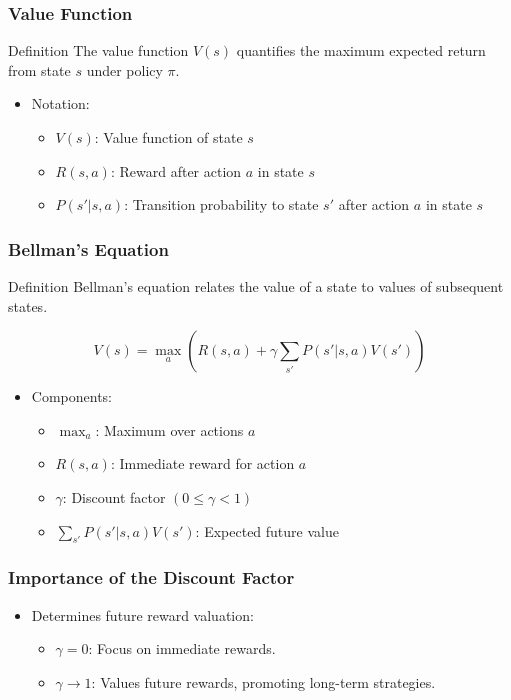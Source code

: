 \documentclass[aspectratio=169]{beamer}
\begin{document}
\begin{frame}[fragile]
    \frametitle{Value Function}
    \begin{block}{Definition}
        The value function \( V(s) \) quantifies the maximum expected return from state \( s \) under policy \( \pi \).
    \end{block}
    \begin{itemize}
        \item Notation:
        \begin{itemize}
            \item \( V(s) \): Value function of state \( s \)
            \item \( R(s, a) \): Reward after action \( a \) in state \( s \)
            \item \( P(s' | s, a) \): Transition probability to state \( s' \) after action \( a \) in state \( s \)
        \end{itemize}
    \end{itemize}
\end{frame}

\begin{frame}[fragile]
    \frametitle{Bellman's Equation}
    \begin{block}{Definition}
        Bellman's equation relates the value of a state to values of subsequent states.
    \end{block}
    \begin{equation}
        V(s) = \max_{a} \left( R(s, a) + \gamma \sum_{s'} P(s' | s, a) V(s') \right)
    \end{equation}
    \begin{itemize}
        \item Components:
        \begin{itemize}
            \item \( \max_{a} \): Maximum over actions \( a \)
            \item \( R(s, a) \): Immediate reward for action \( a \)
            \item \( \gamma \): Discount factor \( (0 \leq \gamma < 1) \)
            \item \( \sum_{s'} P(s' | s, a) V(s') \): Expected future value
        \end{itemize}
    \end{itemize}
\end{frame}

\begin{frame}[fragile]
    \frametitle{Importance of the Discount Factor}
    \begin{itemize}
        \item Determines future reward valuation:
        \begin{itemize}
            \item \( \gamma = 0 \): Focus on immediate rewards.
            \item \( \gamma \to 1 \): Values future rewards, promoting long-term strategies.
        \end{itemize}
    \end{itemize}
\end{frame}
\end{document}
